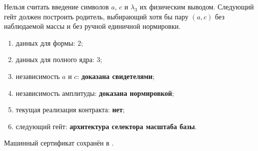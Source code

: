 \begin{nogocriterion}
Нельзя считать введение символов $a$, $c$ и $\lambda_3$ их физическим
выводом. Следующий гейт должен построить родитель, выбирающий хотя бы пару
$(a,c)$ без наблюдаемой массы и без ручной единичной нормировки.
\end{nogocriterion}

\begin{protocol}\begin{enumerate}
\item данных для формы: \textbf{$2$};
\item данных для полного ядра: \textbf{$3$};
\item независимость $a$ и $c$: \textbf{доказана свидетелями};
\item независимость амплитуды: \textbf{доказана нормировкой};
\item текущая реализация контракта: \textbf{нет};
\item следующий гейт: \textbf{архитектура селектора масштаба базы}.
\end{enumerate}\end{protocol}

Машинный сертификат сохранён в
.